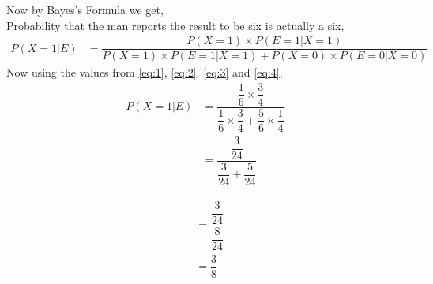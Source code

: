 \documentclass{beamer}
\begin{document}
\begin{frame}
Now by Bayes's Formula we get,\\
Probability that the man reports the result to be six is actually a six,\\
\begin{align}
P(X=1|E)&=\dfrac{P(X=1)\times P(E=1|X=1)}{P(X=1)\times P(E=1|X=1)+P(X=0)\times P(E=0|X=0)}
\end{align}
Now using the values from \eqref{eq:1}, \eqref{eq:2}, \eqref{eq:3} and \eqref{eq:4},
\begin{align}
P(X=1|E)&=\dfrac{\dfrac{1}{6}\times \dfrac{3}{4}}{\dfrac{1}{6}\times \dfrac{3}{4}+\dfrac{5}{6}\times\dfrac{1}{4}}\\
&=\dfrac{\dfrac{3}{24}}{\dfrac{3}{24}+\dfrac{5}{24}}
\end{align}
\end{frame}


\begin{frame}
\begin{align}
&=\dfrac{\dfrac{3}{24}}{\dfrac{8}{24}}\\
&=\dfrac{3}{8}
\end{align}
\end{frame}
\end{document}
